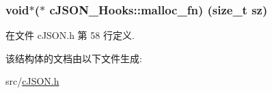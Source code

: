 \subsubsection[{malloc\+\_\+fn}]{\setlength{\rightskip}{0pt plus 5cm}void$\ast$($\ast$ c\+J\+S\+O\+N\+\_\+\+Hooks\+::malloc\+\_\+fn) (size\+\_\+t sz)}\label{structc_j_s_o_n___hooks_a7f7cfcc2ea2d783405e6f4f6eab99ec7}


在文件 c\+J\+S\+O\+N.\+h 第 58 行定义.



该结构体的文档由以下文件生成\+:\begin{DoxyCompactItemize}
\item 
src/\hyperlink{c_j_s_o_n_8h}{c\+J\+S\+O\+N.\+h}\end{DoxyCompactItemize}
